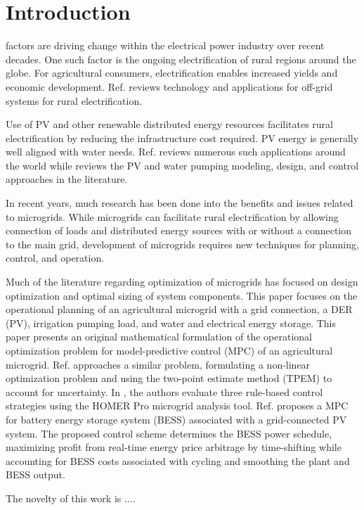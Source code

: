 \section{Introduction}
\label{sec:intro}

 factors are driving change within the electrical power industry over recent decades.
One such factor is the ongoing electrification of rural regions around the globe.
For agricultural consumers, electrification enables increased yields and economic development.
Ref. \cite{Mandelli2016} reviews technology and applications for off-grid systems for rural electrification.

Use of PV and other renewable distributed energy resources facilitates rural electrification by reducing the infrastructure cost required.
PV energy is generally well aligned with water needs\cite{Aliyu2018}.
Ref. \cite{Aliyu2018} reviews numerous such applications around the world while \cite{Muhsen2017} reviews the PV and water pumping modeling, design, and control approaches in the literature.

In recent years, much research has been done into the benefits and issues related to microgrids\cite{Chandak2021,Choudhury2020}.
While microgrids can facilitate rural electrification by allowing connection of loads and distributed energy sources with or without a connection to the main grid,
development of microgrids requires new techniques for planning, control, and operation\cite{Bhuiyan2014,Reca-Cardena2018}.

Much of the literature regarding optimization of microgrids has focused on design optimization and optimal sizing of system components\cite{Bhuiyan2014,Dawoud2018}.
This paper focuses on the operational planning of an agricultural microgrid with a grid connection, a DER (PV), irrigation pumping load, and water and electrical energy storage.
This paper presents an original mathematical formulation of the operational optimization problem for model-predictive control (MPC) of an agricultural microgrid.
Ref. \cite{Ghasemi2018} approaches a similar problem, formulating a non-linear optimization problem and using the two-point estimate method (TPEM) to account for uncertainty. 
In \cite{Shoeb2018}, the authors evaluate three rule-based control strategies using the HOMER Pro microgrid analysis tool.
Ref. \cite{Wang2014} proposes a MPC for battery energy storage system (BESS) associated with a grid-connected PV system. The proposed control scheme determines the BESS power schedule, maximizing profit from real-time energy price arbitrage by time-shifting while accounting for BESS costs associated with cycling and smoothing the plant and BESS output.

The novelty of this work is ....
